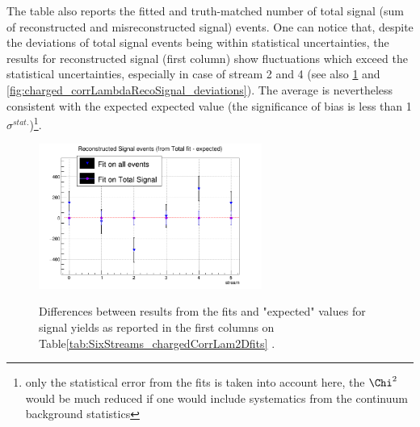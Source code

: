 \noindent  The table also reports the fitted and truth-matched number of total signal (sum of reconstructed and misreconstructed signal) events. 
One can notice that, despite the deviations of total signal events being within statistical uncertainties, the results for reconstructed signal (first column)
show fluctuations which exceed the statistical uncertainties, especially in case of stream 2 and 4 (see also \cref{fig:RecoSignal_fit-expectedPlot} and \cref{fig:charged_corrLambdaRecoSignal_deviations}). 
The average is nevertheless consistent with the expected expected value (the significance of bias is less than 1$\sigma^{stat.}$)\footnote{only the statistical error from the fits is taken into account here, the $\Chi^2$ would be much reduced if one would include systematics from the continuum background statistics}.

\begin{figure}[H]
{\includegraphics[width=0.65\textwidth]{04-chargedCorrBtoLambda/figs/RecoSignal_fit_chargedCorrLambdaC_afterCrossfeedRatioParam.png}}
\caption{Differences between results from the fits and "expected" values for signal yields as reported in the first columns on Table\ref{tab:SixStreams_chargedCorrLam2Dfits} .}
\label{fig:RecoSignal_fit-expectedPlot}
\end{figure}

